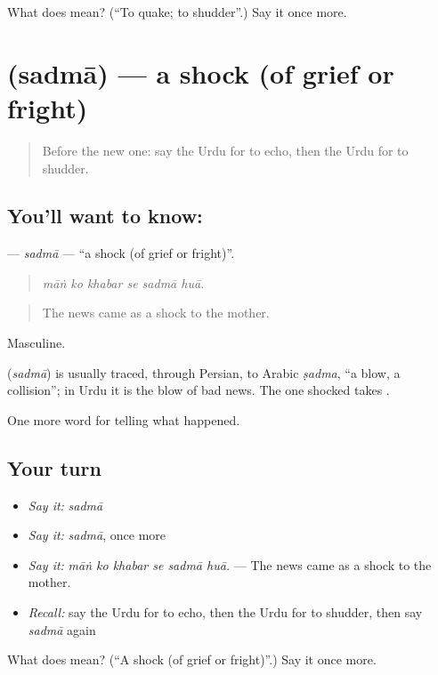 \begin{tcolorbox}[breakable,colback=teal!4,colframe=teal!35!black,title={Before you move on}]
What does  mean? (\textquotedblleft{}To quake; to shudder\textquotedblright{}.) Say it once more.
\end{tcolorbox}
\section[\texorpdfstring{\ur{صدمہ} (sadmā)}{صدمہ (sadmā)}]{ (sadmā) — a shock (of grief or fright)}

\label{lesson:UR-C306-sadma}



\begin{quote}
Before the new one: say the Urdu for to echo, then the Urdu for to shudder.
\end{quote}

\subsection*{You'll want to know: }
\textbf{} — \emph{sadmā} — \textquotedblleft{}a shock (of grief or fright)\textquotedblright{}.

\begin{quote}
     
\end{quote}

\begin{quote}
\emph{māṅ ko khabar se sadmā huā.}
\end{quote}

\begin{quote}
The news came as a shock to the mother.
\end{quote}

Masculine.

\begin{cousinweb}
\textbf{} (\emph{sadmā}) is usually traced, through Persian, to Arabic \emph{ṣadma}, \textquotedblleft{}a blow, a collision\textquotedblright{}; in Urdu it is the blow of bad news. The one shocked takes \textbf{}.
\end{cousinweb}

\begin{grammarlens}[title={What you've built}]
One more word for telling what happened.
\end{grammarlens}

\subsection*{Your turn}
\begin{itemize}
\raggedright
  \item \emph{Say it:} \emph{sadmā}
  \item \emph{Say it:} \emph{sadmā}, once more
  \item \emph{Say it:} \emph{māṅ ko khabar se sadmā huā.} — The news came as a shock to the mother.
  \item \emph{Recall:} say the Urdu for to echo, then the Urdu for to shudder, then say \emph{sadmā} again
\end{itemize}

\begin{tcolorbox}[breakable,colback=teal!4,colframe=teal!35!black,title={Before you move on}]
What does  mean? (\textquotedblleft{}A shock (of grief or fright)\textquotedblright{}.) Say it once more.
\end{tcolorbox}
